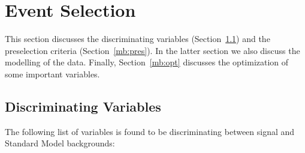 \section{Event Selection}\label{mbselection}

This section discusses the discriminating variables (Section~\ref{mb:disv}) and
the preselection criteria (Section~\ref{mb:pres}). In the latter section we
also discuss the modelling of the data. Finally, Section~\ref{mb:opt} discusses
the optimization of some important variables.

\subsection{Discriminating Variables}\label{mb:disv}

The following list of variables is found to be discriminating between signal
and Standard Model backgrounds:

